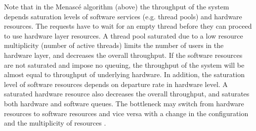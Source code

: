  Note that in the Menasc{\'e} algorithm (above) the throughput of the system depends saturation levels of software services (e.g. thread pools) and hardware resources. The requests have to wait for an empty thread before they can proceed to use hardware layer resources. A thread pool saturated due to a low resource multiplicity (number of active threads) limits the number of users in the hardware layer, and decreases the overall throughput. If the software resources are not saturated and impose no queuing, the throughput of the system will be almost equal to throughput of underlying hardware. 
  In addition, the saturation level of software resources depends on departure rate in hardware level. A saturated hardware resource also decreases the overall throughput, and saturates both hardware and software queues. 
  The bottleneck may switch from hardware resources to software resources and vice versa with a change in the configuration and the multiplicity of resources \cite{Opera,cornel_barna_model-based_2011}.  